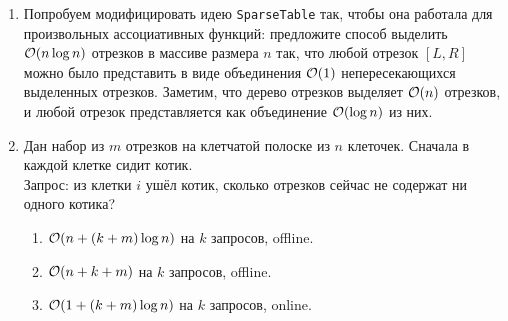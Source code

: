 \begin{enumerate}
  \item
	Попробуем модифицировать идею \texttt{SparseTable} так, чтобы она работала для произвольных ассоциативных функций:
	предложите способ выделить $\mathcal{O}(n \log n)$ отрезков в массиве размера $n$ так, что любой
	отрезок $[L, R]$ можно было представить в виде объединения $\mathcal{O}(1)$ непересекающихся выделенных отрезков. 
	Заметим, что дерево отрезков выделяет $\mathcal{O}(n)$ отрезков, и любой отрезок
	представляется как объединение $\mathcal{O}(\log n)$ из них.

  \item
	Дан набор из $m$ отрезков на клетчатой полоске из $n$ клеточек. Сначала в каждой клетке сидит котик.\\
	Запрос: из клетки $i$ ушёл котик, сколько отрезков сейчас не содержат ни одного котика?

    \begin{enumerate}
      \item $\mathcal{O}(n + (k + m)\log{n})$ на $k$ запросов, offline.
      \item $\mathcal{O}(n + k + m)$ на $k$ запросов, offline.
      \item {} $\mathcal{O}(1 + (k + m)\log{n})$ на $k$ запросов, online.
    \end{enumerate}



\end{enumerate}
